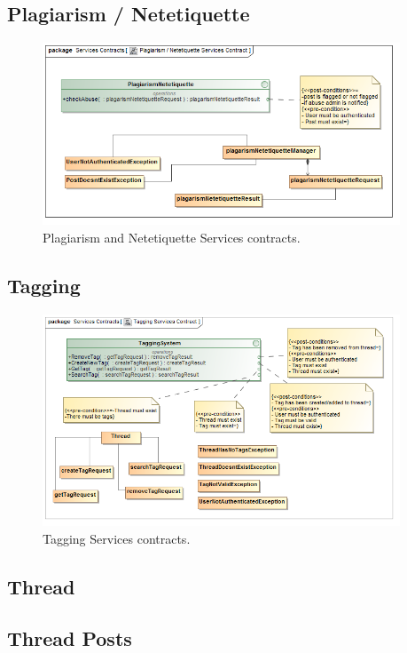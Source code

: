 \documentclass [a4paper,12pt] {article}
\begin{document}
		\subsection*{Plagiarism / Netetiquette}
		\begin{figure}[h!]
			\centering
			\includegraphics[width=0.95\textwidth]{PlagiarismNetetiquetteSC.png}
			\caption{Plagiarism and Netetiquette Services contracts.}
		\end{figure}
		\subsection*{Tagging}
			\begin{figure}[h!]
				\centering
				\includegraphics[width=0.95\textwidth]{TaggingSC.png}
				\caption{Tagging Services contracts.}
			\end{figure}
		\subsection*{Thread}
		\subsection*{Thread Posts}
\end{document}
